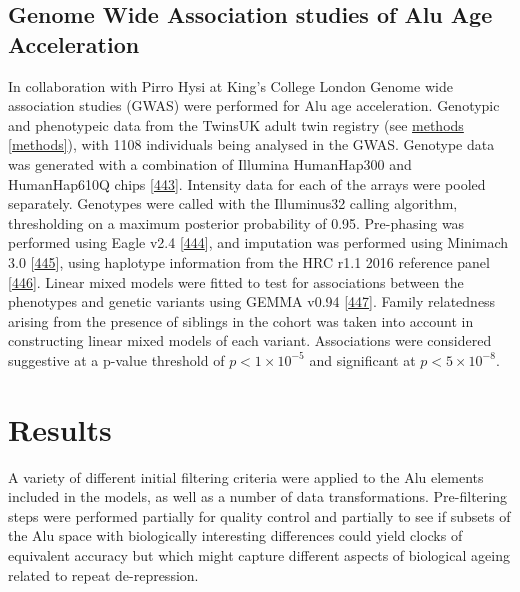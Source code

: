 \documentclass[
]{book}
\begin{document}
\hypertarget{genome-wide-association-studies-of-alu-age-acceleration}{%
\subsection{Genome Wide Association studies of Alu Age Acceleration}\label{genome-wide-association-studies-of-alu-age-acceleration}}

In collaboration with Pirro Hysi at King's College London Genome wide association studies (GWAS) were performed for Alu age acceleration.
Genotypic and phenotypeic data from the TwinsUK adult twin registry (see \protect\hyperlink{methods}{methods} \ref{methods}), with 1108 individuals being analysed in the GWAS.
Genotype data was generated with a combination of Illumina HumanHap300 and HumanHap610Q chips {[}\protect\hyperlink{ref-Hysi2010}{443}{]}.
Intensity data for each of the arrays were pooled separately.
Genotypes were called with the Illuminus32 calling algorithm, thresholding on a maximum posterior probability of 0.95.
Pre-phasing was performed using Eagle v2.4 {[}\protect\hyperlink{ref-Loh2016}{444}{]}, and imputation was performed using Minimach 3.0 {[}\protect\hyperlink{ref-Das2016}{445}{]}, using haplotype information from the HRC r1.1 2016 reference panel {[}\protect\hyperlink{ref-McCarthy2017}{446}{]}.
Linear mixed models were fitted to test for associations between the phenotypes and genetic variants using GEMMA v0.94 {[}\protect\hyperlink{ref-Zhou2012a}{447}{]}.
Family relatedness arising from the presence of siblings in the cohort was taken into account in constructing linear mixed models of each variant.
Associations were considered suggestive at a p-value threshold of \(p < 1\times10^{-5}\) and significant at \(p < 5\times10^{-8}\).

\newpage

\hypertarget{Alu-Results}{%
\section{Results}\label{Alu-Results}}

A variety of different initial filtering criteria were applied to the Alu elements included in the models, as well as a number of data transformations.
Pre-filtering steps were performed partially for quality control and partially to see if subsets of the Alu space with biologically interesting differences could yield clocks of equivalent accuracy but which might capture different aspects of biological ageing related to repeat de-repression.
\end{document}
